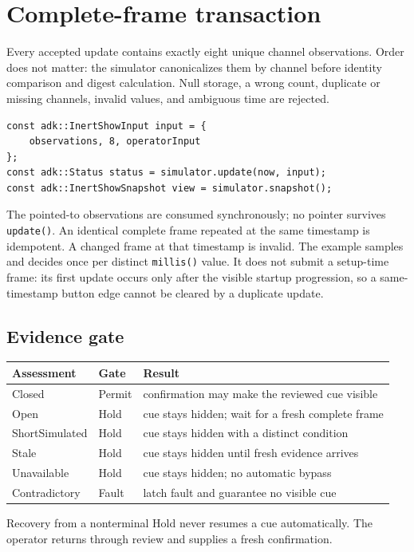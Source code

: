 \documentclass[11pt]{article}
\begin{document}
\section{Complete-frame transaction}

Every accepted update contains exactly eight unique channel observations.
Order does not matter: the simulator canonicalizes them by channel before
identity comparison and digest calculation. Null storage, a wrong count,
duplicate or missing channels, invalid values, and ambiguous time are rejected.

\begin{lstlisting}[style=adkcpp]
const adk::InertShowInput input = {
    observations, 8, operatorInput
};
const adk::Status status = simulator.update(now, input);
const adk::InertShowSnapshot view = simulator.snapshot();
\end{lstlisting}

The pointed-to observations are consumed synchronously; no pointer survives
\texttt{update()}. An identical complete frame repeated at the same timestamp
is idempotent. A changed frame at that timestamp is invalid. The example
samples and decides once per distinct \texttt{millis()} value. It does not
submit a setup-time frame: its first update occurs only after the visible
startup progression, so a same-timestamp button edge cannot be cleared by a
duplicate update.

\subsection{Evidence gate}

\begin{tabularx}{\linewidth}{@{}l l X@{}}
\toprule
Assessment & Gate & Result\\
\midrule
Closed & Permit & confirmation may make the reviewed cue visible\\
Open & Hold & cue stays hidden; wait for a fresh complete frame\\
ShortSimulated & Hold & cue stays hidden with a distinct condition\\
Stale & Hold & cue stays hidden until fresh evidence arrives\\
Unavailable & Hold & cue stays hidden; no automatic bypass\\
Contradictory & Fault & latch fault and guarantee no visible cue\\
\bottomrule
\end{tabularx}

Recovery from a nonterminal Hold never resumes a cue automatically. The
operator returns through review and supplies a fresh confirmation.
\end{document}
